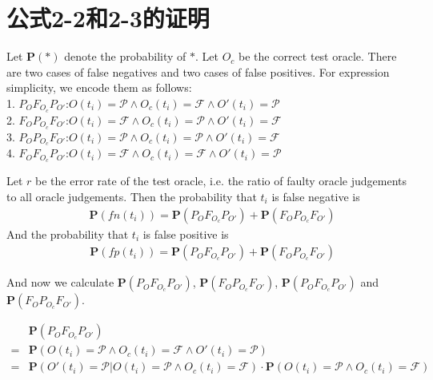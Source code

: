 \chapter{公式2-2和2-3的证明}
\label{cha:proof}

Let $\mathbf{P}(*)$ denote the probability of $*$. Let $O_c$ be the correct test oracle.
There are two cases of false negatives and two cases of false positives. For expression simplicity, we encode them as follows: \\
1. $P_O F_{O_c} P_{O'}$:$O(t_i) = \mathcal{P} \wedge O_c(t_i) = \mathcal{F} \wedge O'(t_i) = \mathcal{P}$ \\
2. $F_O P_{O_c} F_{O'}$:$O(t_i) = \mathcal{F} \wedge O_c(t_i) = \mathcal{P} \wedge O'(t_i) = \mathcal{F}$ \\
3. $P_O P_{O_c} F_{O'}$:$O(t_i) = \mathcal{P} \wedge O_c(t_i) = \mathcal{P} \wedge O'(t_i) = \mathcal{F}$ \\
4. $F_O F_{O_c} P_{O'}$:$O(t_i) = \mathcal{F} \wedge O_c(t_i) = \mathcal{F} \wedge O'(t_i) = \mathcal{P}$

Let $r$ be the error rate of the test oracle, i.e. the ratio of faulty oracle judgements to all oracle judgements. Then the probability that $t_i$ is false negative is
\begin{equation}
\label{equ:FN}
\begin{aligned}
& \mathbf{P}(fn(t_i))= \mathbf{P}(P_O F_{O_c} P_{O'}) + \mathbf{P}(F_O P_{O_c} F_{O'})
\end{aligned}
\end{equation}
And the probability that $t_i$ is false positive is
\begin{equation}
\begin{aligned}
\label{equ: FP}
& \mathbf{P}(fp(t_i))= \mathbf{P}(P_O F_{O_c} P_{O'}) + \mathbf{P}(F_O P_{O_c} F_{O'})
\end{aligned}
\end{equation}

And now we calculate $\mathbf{P}(P_O F_{O_c} P_{O'})$, $\mathbf{P}(F_O P_{O_c} F_{O'})$, $\mathbf{P}(P_O F_{O_c} P_{O'})$ and $\mathbf{P}(F_O P_{O_c} F_{O'})$.

\begin{equation}
\label{equ: P and F and P}
\begin{aligned}
& \mathbf{P}(P_O F_{O_c} P_{O'}) \\
= & \mathbf{P}(O(t_i) = \mathcal{P} \wedge O_c(t_i) = \mathcal{F} \wedge O'(t_i) = \mathcal{P}) \\
= & \mathbf{P}(O'(t_i) = \mathcal{P} | O(t_i) = \mathcal{P} \wedge O_c(t_i) = \mathcal{F}) \cdot \mathbf{P}(O(t_i) = \mathcal{P} \wedge O_c(t_i) = \mathcal{F})
\end{aligned}
\end{equation}

